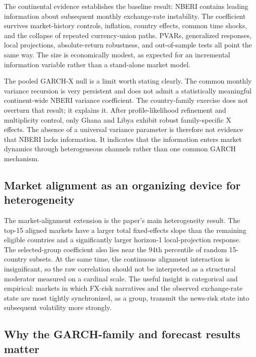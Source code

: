 \documentclass[11pt]{article}
\begin{document}
The continental evidence establishes the baseline result: NBERI contains
leading information about subsequent monthly exchange-rate instability.
The coefficient survives market-history controls, inflation, country
effects, common time shocks, and the collapse of repeated currency-union
paths. PVARs, generalized responses, local projections, absolute-return
robustness, and out-of-sample tests all point the same way. The size is
economically modest, as expected for an incremental information variable
rather than a stand-alone market model.

The pooled GARCH-X null is a limit worth stating clearly. The common
monthly variance recursion is very persistent and does not admit a
statistically meaningful continent-wide NBERI variance coefficient. The
country-family exercise does not overturn that result; it explains
it. After profile-likelihood refinement and multiplicity control, only
Ghana and Libya exhibit robust family-specific X effects. The absence of
a universal variance parameter is therefore not evidence that NBERI
lacks information. It indicates that the information enters market
dynamics through heterogeneous channels rather than one common GARCH
mechanism.

\subsection{Market alignment as an organizing device for
heterogeneity}\label{market-alignment-as-an-organizing-device-for-heterogeneity}

The market-alignment extension is the paper's main
heterogeneity result. The top-15 aligned markets have a larger total
fixed-effects slope than the remaining eligible countries and a
significantly larger horizon-1 local-projection response. The
selected-group coefficient also lies near the 94th percentile of random
15-country subsets. At the same time, the continuous alignment
interaction is insignificant, so the raw correlation should not be
interpreted as a structural moderator measured on a cardinal scale. The
useful insight is categorical and empirical: markets in which FX-risk
narratives and the observed exchange-rate state are most tightly
synchronized, as a group, transmit the news-risk state into subsequent
volatility more strongly.

\subsection{Why the GARCH-family and forecast results
matter}\label{why-the-garch-family-and-forecast-results-matter}
\end{document}
